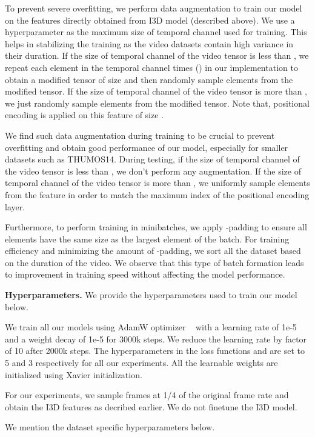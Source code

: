 \documentclass[10pt,twocolumn,letterpaper]{article}
\begin{document}
To prevent severe overfitting, we perform data augmentation to train our model on the features directly obtained from I3D model (described above). We use a hyperparameter  as the maximum size of temporal channel used for training. This helps in stabilizing the training as the video datasets contain high variance in their duration. If the size of temporal channel of the video tensor  is less than , we repeat each element in the temporal channel  times () in our implementation to obtain a modified tensor of size  and then randomly sample  elements from the modified tensor. If the size of temporal channel of the video tensor  is more than , we just randomly sample  elements from the modified tensor. Note that, positional encoding is applied on this feature of size .

 We find such data augmentation during training to be crucial to prevent overfitting and obtain good performance of our model, especially for smaller datasets such as THUMOS14. 
During testing, if the size of temporal channel of the video tensor  is less than , we don't perform any augmentation. If the size of temporal channel of the video tensor  is more than , we uniformly sample  elements from the feature in order to match the maximum index of the positional encoding layer.

Furthermore, to perform training in minibatches, we apply -padding to ensure all elements have the same size as the largest element of the batch. For training efficiency and minimizing the amount of -padding, we sort all the dataset 
based on the duration of the video. We observe that this type of batch formation leads to improvement in training speed without affecting the model performance.


\vspace{0.05in}
\noindent
\textbf{Hyperparameters.} We provide the hyperparameters used to train our model below.

We train all our models using AdamW optimizer ~\cite{loshchilov2017decoupled} with a learning rate of 1e-5 and a weight decay of 1e-5 for 3000k steps. We reduce the learning rate by factor of 10 after 2000k steps. The hyperparameters in the loss functions  and  are set to 5 and 3 respectively for all our experiments. All the learnable weights are initialized using Xavier initialization. 

For our experiments, we sample frames at 1/4 of the original frame rate and obtain the I3D features as decribed earlier. We do not finetune the I3D model.

We mention the dataset specific hyperparameters below.
\end{document}
